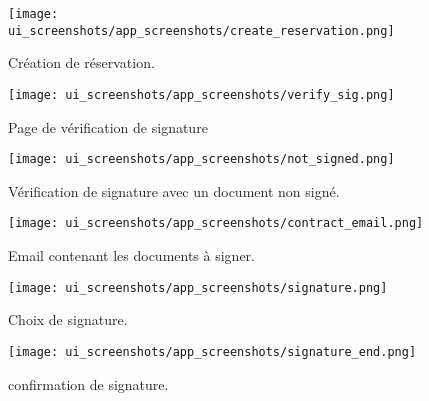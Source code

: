 \begin{multicols}{2}
    \begin{figure}[H]
        \centering
        \texttt{[image: ui\_screenshots/app\_screenshots/create\_reservation.png]}
        \captionsetup{justification=centering}
        \caption{Création de réservation.}
        \label{fig:create_res}
    \end{figure}
    \begin{figure}[H]
        \centering
        \texttt{[image: ui\_screenshots/app\_screenshots/verify\_sig.png]}
        \captionsetup{justification=centering}
        \caption{Page de vérification de signature}
        \label{fig:verify_sig}
    \end{figure}
\end{multicols}
\vspace{1cm}
\clearpage
\begin{multicols}{2}
    \begin{figure}[H]
        \centering
        \texttt{[image: ui\_screenshots/app\_screenshots/not\_signed.png]}
        \captionsetup{justification=centering}
        \caption{Vérification de signature avec un document non signé.}
        \label{fig:not_signed}
    \end{figure}
    \begin{figure}[H]
        \centering
        \texttt{[image: ui\_screenshots/app\_screenshots/contract\_email.png]}
        \captionsetup{justification=centering}
        \caption{Email contenant les documents à signer.}
        \label{fig:sign_documents}
    \end{figure}
\end{multicols}
\vspace{1cm}
\begin{multicols}{2}
    \begin{figure}[H]
        \centering
        \texttt{[image: ui\_screenshots/app\_screenshots/signature.png]}
        \captionsetup{justification=centering}
        \caption{Choix de signature.}
        \label{fig:signature_select}
    \end{figure}
    \begin{figure}[H]
        \centering
        \texttt{[image: ui\_screenshots/app\_screenshots/signature\_end.png]}
        \captionsetup{justification=centering}
        \caption{confirmation de signature.}
        \label{fig:confirm_sig}
    \end{figure}
\end{multicols}
